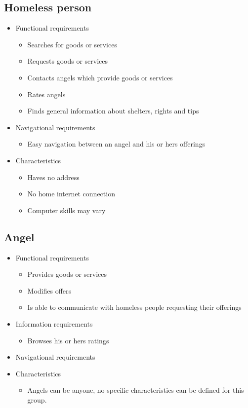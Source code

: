 \documentclass[a4paper]{report}
\begin{document}
\subsection{Homeless person}
\begin{itemize}
	\item Functional requirements
	\begin{itemize}
		\item Searches for goods or services
		\item Requests goods or services
		\item Contacts angels which provide goods or services
		\item Rates angels
		\item Finds general information about shelters, rights and tips
	\end{itemize}
	\item Navigational requirements
	\begin{itemize}
		\item Easy navigation between an angel and his or hers offerings
	\end{itemize}
	\item Characteristics
	\begin{itemize}
		\item Haves no address
		\item No home internet connection
		\item Computer skills may vary
	\end{itemize}
\end{itemize}

\subsection{Angel}
\begin{itemize}
	\item Functional requirements
	\begin{itemize}
		\item Provides goods or services
		\item Modifies offers
		\item Is able to communicate with homeless people requesting their offerings
	\end{itemize}
	\item Information requirements
	\begin{itemize}
		\item Browses his or hers ratings
	\end{itemize}
	\item Navigational requirements
	\item Characteristics
	\begin{itemize}
		\item Angels can be anyone, no specific characteristics can be defined for this group.
	\end{itemize}
\end{itemize}
\end{document}

